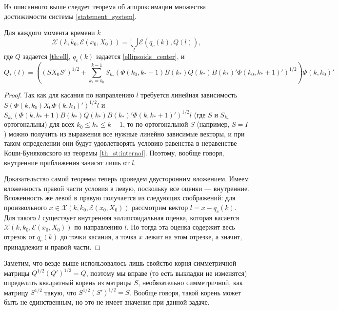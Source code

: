 \documentclass[10pt, a4paper]{article}
\renewcommand{\ell}{\mathcal{E}}
\begin{document}
Из описанного выше следует теорема об аппроксимации множества достижимости системы \eqref{statement_system}.
\begin{theorem}
Для каждого момента времени $k$
\[\mathcal{X}\left(k,k_0,\ell\left(x_0,X_0\right)\right) = 
	\bigcup\limits_{l}\ell\left( q_c(k), Q(l) \right), \]
	где $Q$ задается \eqref{th:ell}, $q_c(k)$ задается \eqref{ellipsoids_center}, и 
	\begin{equation}
		Q_*(l) = \left( \left(SX_0S'\right)^{1/2} + \sum\limits_{k_*=k_0}^{k-1}S_{k_*}\left(\Phi(k_0,k_*+1)B(k_*)Q(k_*)B(k_*)'\Phi(k_0,k_*+1)'\right)^{1/2} \right) 
		\Phi(k,k_0)'
	\end{equation}
\end{theorem}
\begin{proof}
	Так как для касания по направлению $l$ требуется линейная зависимость $S\left(\Phi\left(k,k_0\right)X_0\Phi\left(k,k_0\right)'\right)^{1/2}l$ и $S_{k_*}\left(\Phi\left(k,k_*+1\right)B\left(k_*\right)Q\left(k_*\right)B\left(k_*\right)'\Phi\left(k,k_*+1\right)'\right)^{1/2}l$  (где $S$ и  $S_{k_*}$ ортогональны) для всех $k_0 \leqslant k_* \leqslant k-1$, то по ортогональной $S$ (например, $S=I$) можно получить из выражения все нужные линейно зависимые векторы, и при таком определении они будут удовлетворять условию равенства в неравенстве Коши-Буняковского из теоремы \ref{th_st:internal}. Поэтому, вообще говоря, внутренние приближения зависят лишь от $l$.

Доказательство самой теоремы теперь проведем двусторонним вложением. Имеем вложенность правой части условия в левую, поскольку все оценки --- внутренние. Вложенность же левой в правую получается из следующих соображений: для произвольного $x \in \mathcal{X}\left(k,k_0,\ell\left(x_0,X_0\right)\right)$ рассмотрим вектор $l = x - q_c(k)$. Для такого $l$ существует внутренняя эллипсоидальная оценка, которая касается $\mathcal{X}\left(k,k_0,\ell\left(x_0,X_0\right)\right)$ по направлению $l$. Но тогда эта оценка содержит весь отрезок от $q_c(k)$ до точки касания, а точка $x$ лежит на этом отрезке, а значит, принадлежит и правой части.
\end{proof}
\begin{note}
Заметим, что везде выше использовалось лишь свойство корня симметричной матрицы $Q^{1/2}\left(Q'\right)^{1/2} = Q$, поэтому мы вправе (то есть выкладки не изменятся) определить квадратный корень из матрицы $S$, необязательно симметричной, как матрицу $S^{1/2}$ такую, что $S^{1/2}\left(S'\right)^{1/2} = S$. Вообще говоря, такой корень может быть не единственным, но это не имеет значения при данной задаче.
\end{note}
\end{document}
